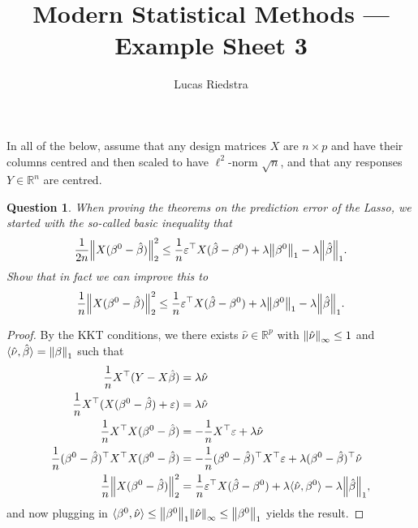 \documentclass{article}
\title{Modern Statistical Methods --- Example Sheet 3} %
\author{Lucas Riedstra}
\theoremstyle{plain}
\newtheorem{question}{Question}
\theoremstyle{remark}
\renewcommand{\epsilon}{\varepsilon}
\newcommand{\Bb}{\mathbb}
\newcommand{\RR}{\Bb R}
\DeclarePairedDelimiter{\ang}{\langle}{\rangle}
\newcommand{\T}{^\top} %
\newcommand\eps\epsilon
\begin{document}
\maketitle
\begin{mdframed}
	In all of the below, assume that any design matrices $X$ are $n \times p$ and have their columns centred and then scaled to have $\ell^2$-norm $\sqrt n$, and that any responses $Y \in \RR^n$ are centred. 
\end{mdframed}
\begin{question}
	When proving the theorems on the prediction error of the Lasso, we started with the so-called basic inequality that
	\[
	\frac1{2n} \norm{X(\beta^0 - \hat\beta)}_2^2 \leq \frac1n \eps\T X(\hat\beta - \beta^0) + \lambda \norm{\beta^0}_1 - \lambda \norm{\hat\beta}_1. 
	\]
	Show that in fact we can improve this to 
		\[
	\frac1{n} \norm{X(\beta^0 - \hat\beta)}_2^2 \leq \frac1n \eps\T X(\hat\beta - \beta^0) + \lambda \norm{\beta^0}_1 - \lambda \norm{\hat\beta}_1. 
	\]
\end{question}

\begin{proof}
	By the KKT conditions, we there exists $\hat\nu \in \RR^p$ with $\norm{\hat\nu}_\infty \leq 1$ and $\ang{\hat\nu, \hat\beta} = \norm{\beta}_1$ such that 
	\begin{align*}
		\frac1n X\T (Y - X\hat\beta) &= \lambda\hat\nu \\
		\frac1n X\T (X(\beta^0 - \hat\beta) + \eps) &= \lambda\hat\nu \\
		\frac1n X\T X(\beta^0 - \hat\beta) &= - \frac1n X\T\eps + \lambda\hat\nu \\
		\frac1n (\beta^0 - \hat\beta)\T X\T X(\beta^0 - \hat\beta) &= -\frac1n (\beta^0 - \hat\beta)\T X\T\eps + \lambda (\beta^0 - \hat\beta)\T \hat\nu \\
		\frac1n \norm{X(\beta^0 -  \hat\beta)}_2^2 &= \frac1n \eps\T X(\hat\beta - \beta^0) + \lambda \ang{\hat\nu, \beta^0} - \lambda \norm{\hat\beta}_1,
		\end{align*}
	and now plugging in $\ang{\beta^0, \hat\nu} \leq \norm{\beta^0}_1 \norm{\hat\nu}_\infty \leq \norm{\beta^0}_1$ yields the result. 
\end{proof}
\end{document}
